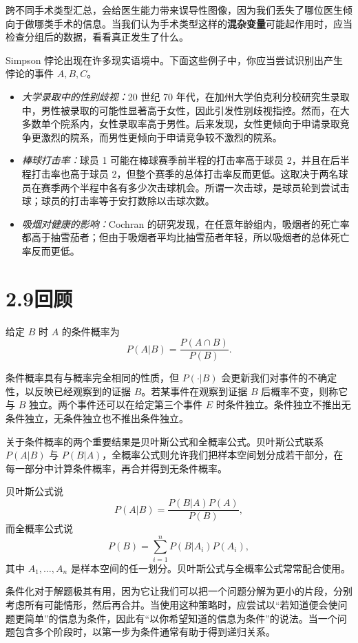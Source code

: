 \documentclass[UTF8, 12pt, fontset=fandol, oneside]{ctexart}
\begin{document}
跨不同手术类型汇总，会给医生能力带来误导性图像，因为我们丢失了哪位医生倾向于做哪类手术的信息。当我们认为手术类型这样的\textbf{混杂变量}可能起作用时，应当检查分组后的数据，看看真正发生了什么。

Simpson 悖论出现在许多现实语境中。下面这些例子中，你应当尝试识别出产生悖论的事件 $A,B,C$。

\begin{itemize}
  \item \textit{大学录取中的性别歧视：}20 世纪 70 年代，在加州大学伯克利分校研究生录取中，男性被录取的可能性显著高于女性，因此引发性别歧视指控。然而，在大多数单个院系内，女性录取率高于男性。后来发现，女性更倾向于申请录取竞争更激烈的院系，而男性更倾向于申请竞争较不激烈的院系。
  \item \textit{棒球打击率：}球员 1 可能在棒球赛季前半程的打击率高于球员 2，并且在后半程打击率也高于球员 2，但整个赛季的总体打击率反而更低。这取决于两名球员在赛季两个半程中各有多少次击球机会。所谓一次击球，是球员轮到尝试击球；球员的打击率等于安打数除以击球次数。
  \item \textit{吸烟对健康的影响：}Cochran 的研究发现，在任意年龄组内，吸烟者的死亡率都高于抽雪茄者；但由于吸烟者平均比抽雪茄者年轻，所以吸烟者的总体死亡率反而更低。
\end{itemize}

\section*{2.9\quad 回顾}

给定 $B$ 时 $A$ 的条件概率为
\[
  P(A|B)=\frac{P(A\cap B)}{P(B)}.
\]

条件概率具有与概率完全相同的性质，但 $P(\cdot|B)$ 会更新我们对事件的不确定性，以反映已经观察到的证据 $B$。若某事件在观察到证据 $B$ 后概率不变，则称它与 $B$ 独立。两个事件还可以在给定第三个事件 $E$ 时条件独立。条件独立不推出无条件独立，无条件独立也不推出条件独立。

关于条件概率的两个重要结果是贝叶斯公式和全概率公式。贝叶斯公式联系 $P(A|B)$ 与 $P(B|A)$，全概率公式则允许我们把样本空间划分成若干部分，在每一部分中计算条件概率，再合并得到无条件概率。

贝叶斯公式说
\[
  P(A|B)=\frac{P(B|A)P(A)}{P(B)},
\]
而全概率公式说
\[
  P(B)=\sum_{i=1}^n P(B|A_i)P(A_i),
\]
其中 $A_1,\ldots,A_n$ 是样本空间的任一划分。贝叶斯公式与全概率公式常常配合使用。

条件化对于解题极其有用，因为它让我们可以把一个问题分解为更小的片段，分别考虑所有可能情形，然后再合并。当使用这种策略时，应尝试以“若知道便会使问题更简单”的信息为条件，因此有“以你希望知道的信息为条件”的说法。当一个问题包含多个阶段时，以第一步为条件通常有助于得到递归关系。
\end{document}
